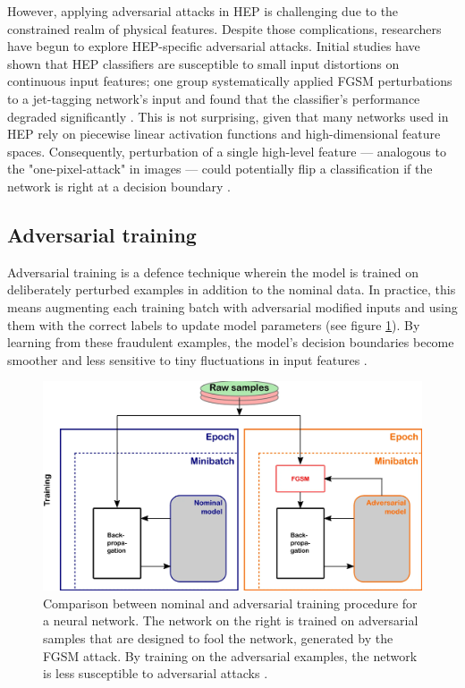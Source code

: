 However, applying adversarial attacks in HEP is challenging due to the constrained realm of physical features. Despite those complications, researchers have begun to explore HEP-specific adversarial attacks. Initial studies have shown that HEP classifiers are susceptible to small input distortions on continuous input features; one group systematically applied FGSM perturbations to a jet-tagging network's input and found that the classifier's performance degraded significantly \cite{Stein2022}. This is not surprising, given that many networks used in HEP rely on piecewise linear activation functions and high-dimensional feature spaces. Consequently, perturbation of a single high-level feature — analogous to the "one-pixel-attack" in images — could potentially flip a classification if the network is right at a decision boundary \cite{Stein2022}.

\subsection{Adversarial training}

Adversarial training is a defence technique wherein the model is trained on deliberately perturbed examples in addition to the nominal data. In practice, this means augmenting each training batch with adversarial modified inputs and using them with the correct labels to update model parameters (see figure \ref{fig:adversarial_training}). By learning from these fraudulent examples, the model's decision boundaries become smoother and less sensitive to tiny fluctuations in input features \cite{goodfellow2015explainingharnessingadversarialexamples}.

\begin{figure}
    \centering
    \includegraphics[width=0.8\linewidth]{media/adversarial_training.png}
    \caption{Comparison between nominal and adversarial training procedure for a neural network. The network on the right is trained on adversarial samples that are designed to fool the network, generated by the FGSM attack. By training on the adversarial examples, the network is less susceptible to adversarial attacks \cite{Stein2022}.}
    \label{fig:adversarial_training}
\end{figure}

